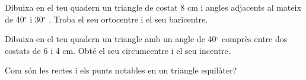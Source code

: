 \begin{mylist}
	\exer  Dibuixa en el teu quadern un triangle de costat 8 cm i angles adjacents al mateix de 40${}^\circ$  i 30${}^\circ$ . Troba el seu ortocentre i el seu baricentre.
	
	
	\exer  Dibuixa en el teu quadern un triangle amb un angle de 40${}^\circ$  comprès entre dos costats de 6 i 4 cm. Obté el seu circumcentre i el seu incentre.
	
	
	\exer  Com són les rectes i els punts notables en un triangle equilàter?
	
	
\end{mylist}

 
\pagebreak

